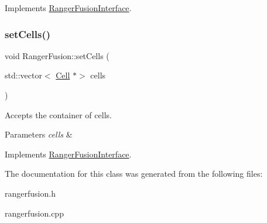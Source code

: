 Implements \hyperlink{classRangerFusionInterface_a65155605804376da4f67baf3c6f97f40}{Ranger\+Fusion\+Interface}.

\mbox{\label{classRangerFusion_a9b69869bd1e3bca155bcecbad5ea463b}} 
\subsubsection{\texorpdfstring{set\+Cells()}{setCells()}}
{\footnotesize\ttfamily void Ranger\+Fusion\+::set\+Cells (\begin{DoxyParamCaption}\item[{std\+::vector$<$ \hyperlink{classCell}{Cell} $\ast$$>$}]{cells }\end{DoxyParamCaption})\hspace{0.3cm}{\ttfamily [virtual]}}



Accepts the container of cells. 


\begin{DoxyParams}{Parameters}
{\em cells} & \\
\hline
\end{DoxyParams}


Implements \hyperlink{classRangerFusionInterface_ab8fdee0050521767d33179a63da91e4f}{Ranger\+Fusion\+Interface}.



The documentation for this class was generated from the following files\+:\begin{DoxyCompactItemize}
\item 
rangerfusion.\+h\item 
rangerfusion.\+cpp\end{DoxyCompactItemize}
